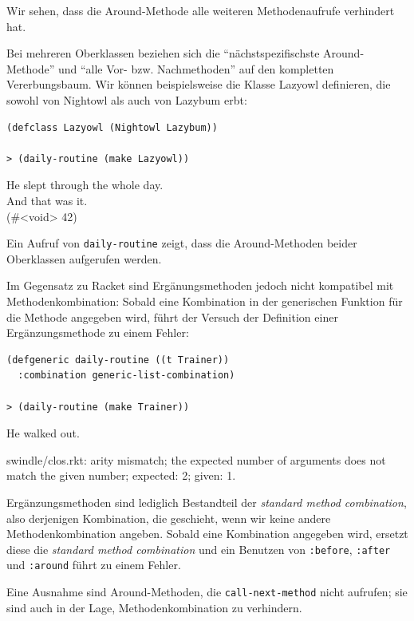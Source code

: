 Wir sehen, dass die Around-Methode alle weiteren Methodenaufrufe verhindert hat. 

Bei mehreren Oberklassen beziehen sich die ``nächstspezifischste Around-Methode'' und ``alle Vor- bzw. Nachmethoden'' auf den kompletten Vererbungsbaum. Wir können beispielsweise die Klasse Lazyowl definieren, die sowohl von Nightowl als auch von Lazybum erbt:

\begin{lstlisting}
(defclass Lazyowl (Nightowl Lazybum))

> (daily-routine (make Lazyowl))
\end{lstlisting}
{\routput He slept through the whole day.\\
\phantom{.}And that was it.\\
\phantom{.}(\#<void> 42)}

Ein Aufruf von \texttt{daily-routine} zeigt, dass die Around-Methoden beider Oberklassen aufgerufen werden. 

Im Gegensatz zu Racket sind Ergänungsmethoden jedoch nicht kompatibel mit Methodenkombination: Sobald eine Kombination in der generischen Funktion für die Methode angegeben wird, führt der Versuch der Definition einer Ergänzungsmethode zu einem Fehler:

\begin{lstlisting}
(defgeneric daily-routine ((t Trainer))
  :combination generic-list-combination)
  
> (daily-routine (make Trainer))
\end{lstlisting}
{\routput He walked out.}

\vspace{-0.3cm}
{\rerror swindle/clos.rkt: arity mismatch; the expected number of arguments does not match the given number; expected: 2; given: 1.}

Ergänzungsmethoden sind lediglich Bestandteil der \emph{standard method combination}, also derjenigen Kombination, die geschieht, wenn wir keine andere Methodenkombination angeben. Sobald eine Kombination angegeben wird, ersetzt diese die \textit{standard method combination} und ein Benutzen von \texttt{:before}, \texttt{:after} und \texttt{:around} führt zu einem Fehler.

Eine Ausnahme sind Around-Methoden, die \texttt{call-next-method} nicht aufrufen; sie sind auch in der Lage, Methodenkombination zu verhindern.

